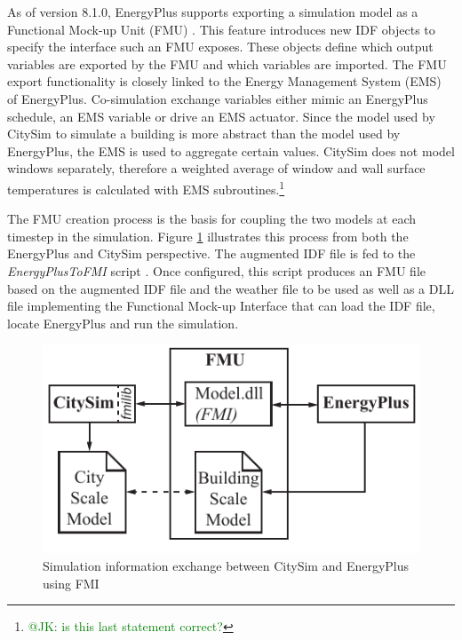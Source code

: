 \documentclass{tBPS2e}
\theoremstyle{plain}
\theoremstyle{definition}
\theoremstyle{remark}
\newcommand{\noteDT}[1]{\footnote{\textcolor{green}{#1}}}
\begin{document}
As of version 8.1.0, EnergyPlus supports exporting a simulation model as a Functional Mock-up Unit (FMU) \citep{Nouidui:2014hq,Anonymous:ZZTfF80-}. This feature introduces new IDF objects to specify the interface such an FMU exposes. These objects define which output variables are exported by the FMU and which variables are imported. The FMU export functionality is closely linked to the Energy Management System (EMS) of EnergyPlus. Co-simulation exchange variables either mimic an EnergyPlus schedule, an EMS variable or drive an EMS actuator. Since the model used by CitySim to simulate a building is more abstract than the model used by EnergyPlus, the EMS is used to aggregate certain values. CitySim does not model windows separately, therefore a weighted average of window and wall surface temperatures is calculated with EMS subroutines.\noteDT{@JK: is this last statement correct?}



The FMU creation process is the basis for coupling the two models at each timestep in the simulation. Figure \ref{fig:FMUOverview} illustrates this process from both the EnergyPlus and CitySim perspective. The augmented IDF file is fed to the \emph{EnergyPlusToFMI} script \citep{Nouidui:2014bo}. Once configured, this script produces an FMU file based on the augmented IDF file and the weather file to be used as well as a DLL file implementing the Functional Mock-up Interface that can load the IDF file, locate EnergyPlus and run the simulation. 

\begin{figure}[H]
\centering
\includegraphics[scale=0.7]{figures/UMEM_FMU_Overview}
\caption{Simulation information exchange between CitySim and EnergyPlus using FMI \citep{thomas2014multiscale}}
\label{fig:FMUOverview}
\end{figure}
\end{document}
